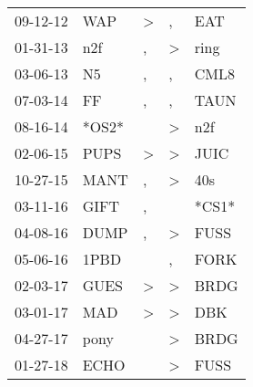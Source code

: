 \begin{supertabular}{p{0.07\textwidth}p{0.06\textwidth}p{0.02\textwidth}p{0.02\textwidth}p{0.06\textwidth}}
          09-12-12\textsuperscript{} &            WAP\textsuperscript{} &     \textgreater &                , &            EAT\textsuperscript{} \\
          01-31-13\textsuperscript{} &            n2f\textsuperscript{} &                , &     \textgreater &           ring\textsuperscript{} \\
          03-06-13\textsuperscript{} &             N5\textsuperscript{} &                , &                , &           CML8\textsuperscript{} \\
          07-03-14\textsuperscript{} &             FF\textsuperscript{} &                , &                , &           TAUN\textsuperscript{} \\
          08-16-14\textsuperscript{} &                            *OS2* &                  &     \textgreater &            n2f\textsuperscript{} \\
          02-06-15\textsuperscript{} &           PUPS\textsuperscript{} &     \textgreater &     \textgreater &           JUIC\textsuperscript{} \\
          10-27-15\textsuperscript{} &           MANT\textsuperscript{} &                , &     \textgreater &            40s\textsuperscript{} \\
          03-11-16\textsuperscript{} &           GIFT\textsuperscript{} &                , &                  &                            *CS1* \\
          04-08-16\textsuperscript{} &           DUMP\textsuperscript{} &                , &     \textgreater &           FUSS\textsuperscript{} \\
          05-06-16\textsuperscript{} &           1PBD\textsuperscript{} &                  &                , &           FORK\textsuperscript{} \\
          02-03-17\textsuperscript{} &           GUES\textsuperscript{} &     \textgreater &     \textgreater &           BRDG\textsuperscript{} \\
          03-01-17\textsuperscript{} &            MAD\textsuperscript{} &     \textgreater &     \textgreater &            DBK\textsuperscript{} \\
          04-27-17\textsuperscript{} &           pony\textsuperscript{} &                  &     \textgreater &           BRDG\textsuperscript{} \\
          01-27-18\textsuperscript{} &           ECHO\textsuperscript{} &                  &     \textgreater &           FUSS\textsuperscript{} \\

\end{supertabular}
